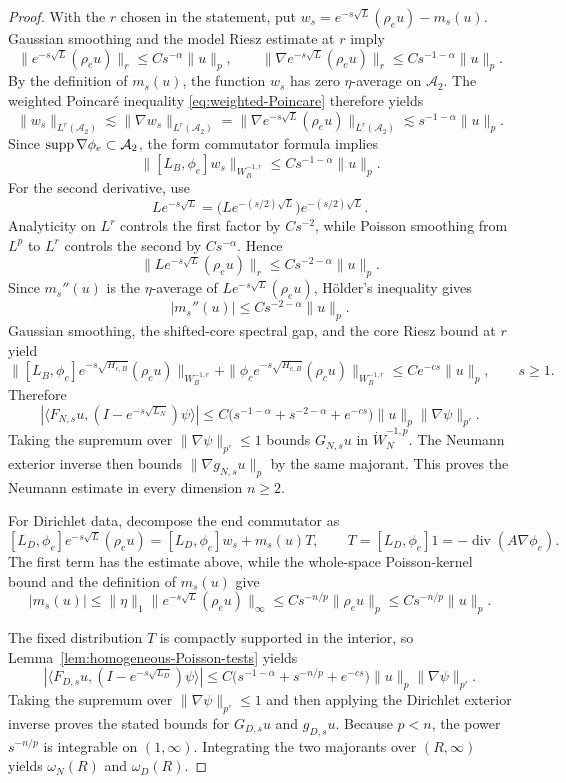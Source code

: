 \documentclass[12pt]{amsart}
\newcommand{\supp}{{\rm supp}{\hspace{.05cm}}}
\newcommand{\diver}{\operatorname{div}}
\theoremstyle{remark}
\begin{document}
\begin{proof}
With the \(r\) chosen in the statement, put $w_s=e^{-s\sqrt L}(\rho_eu)-m_s(u)$. Gaussian smoothing and the model Riesz estimate at \(r\) imply
\[
 \|e^{-s\sqrt L}(\rho_eu)\|_r
 \leq Cs^{-\alpha}\|u\|_p,\qquad
 \|\nabla e^{-s\sqrt L}(\rho_eu)\|_r
 \leq Cs^{-1-\alpha}\|u\|_p.
\]
By the definition of \(m_s(u)\), the function \(w_s\) has zero
\(\eta\)-average on \(\mathcal A_2\).  The weighted Poincar\'e inequality
\eqref{eq:weighted-Poincare} therefore yields
\[
 \|w_s\|_{L^r(\mathcal A_2)}
 \lesssim\|\nabla w_s\|_{L^r(\mathcal A_2)}
 =\|\nabla e^{-s\sqrt L}(\rho_eu)\|_{L^r(\mathcal A_2)}
 \lesssim s^{-1-\alpha}\|u\|_p.
\]
Since \(\supp\nabla\phi_e\subset\mathcal A_2\), the form commutator formula
implies
\[
 \|[L_B,\phi_e]w_s\|_{W_B^{-1,r}}
 \leq Cs^{-1-\alpha}\|u\|_p.
\]
For the second derivative, use
\[
 Le^{-s\sqrt L}
 =\bigl(Le^{-(s/2)\sqrt L}\bigr)e^{-(s/2)\sqrt L}.
\]
Analyticity on \(L^r\) controls the first factor by \(Cs^{-2}\), while
Poisson smoothing from \(L^p\) to \(L^r\) controls the second by
\(Cs^{-\alpha}\).  Hence
\[
 \|Le^{-s\sqrt L}(\rho_eu)\|_r
 \leq Cs^{-2-\alpha}\|u\|_p.
\]
Since \(m_s''(u)\) is the \(\eta\)-average of
\(Le^{-s\sqrt L}(\rho_eu)\), H\"older's inequality gives
\[
 |m_s''(u)|\leq Cs^{-2-\alpha}\|u\|_p.
\]
Gaussian smoothing, the shifted-core spectral gap, and the core Riesz
bound at \(r\) yield
\[
 \|[L_B,\phi_c]e^{-s\sqrt{H_{c,B}}}(\rho_cu)\|_{W_B^{-1,r}}
 +\|\phi_ce^{-s\sqrt{H_{c,B}}}(\rho_cu)\|_{W_B^{-1,r}}
 \leq Ce^{-cs}\|u\|_p,
 \qquad s\geq1.
\]
Therefore
\[
 |\langle F_{N,s}u,(I-e^{-s\sqrt{L_N}})\psi\rangle|
 \leq C\bigl(s^{-1-\alpha}+s^{-2-\alpha}+e^{-cs}\bigr)
       \|u\|_p\|\nabla\psi\|_{p'}.
\]
Taking the supremum over \(\|\nabla\psi\|_{p'}\leq1\) bounds
\(G_{N,s}u\) in \(\dot W^{-1,p}_N\).  The Neumann exterior inverse then
bounds \(\|\nabla g_{N,s}u\|_p\) by the same majorant.  This proves the
Neumann estimate in every dimension \(n\geq2\).

For Dirichlet data, decompose the end commutator as
\[
 [L_D,\phi_e]e^{-s\sqrt L}(\rho_eu)
 =[L_D,\phi_e]w_s+m_s(u)T,
 \qquad T=[L_D,\phi_e]1=-\diver(A\nabla\phi_e).
\]
The first term has the estimate above, while the whole-space
Poisson-kernel bound and the definition of $m_s(u)$ give
\[
 |m_s(u)|
 \leq\|\eta\|_1
       \|e^{-s\sqrt L}(\rho_eu)\|_\infty
 \leq Cs^{-n/p}\|\rho_eu\|_p
 \leq Cs^{-n/p}\|u\|_p.
\]

The fixed distribution \(T\) is compactly supported in the interior, so
Lemma~\ref{lem:homogeneous-Poisson-tests} yields
\[
 |\langle F_{D,s}u,(I-e^{-s\sqrt{L_D}})\psi\rangle|
 \leq C\bigl(s^{-1-\alpha}+s^{-n/p}+e^{-cs}\bigr)
       \|u\|_p\|\nabla\psi\|_{p'}.
\]
Taking the supremum over \(\|\nabla\psi\|_{p'}\leq1\) and then applying
the Dirichlet exterior inverse proves the stated bounds for
\(G_{D,s}u\) and \(g_{D,s}u\).  Because \(p<n\), the power
\(s^{-n/p}\) is integrable on \((1,\infty)\).  Integrating the two
majorants over \((R,\infty)\) yields \(\omega_N(R)\) and
\(\omega_D(R)\).
\end{proof}
\end{document}
